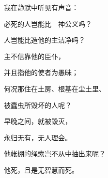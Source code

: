 {\par }{\Q 我在静默中听见有声音{}：
\par }{\Q {}必死的人岂能比　神公义吗？
\par }{\Q 人岂能比造他的主洁净吗？
\par }{\Q {}主不信靠他的臣仆，
\par }{\Q 并且指他的使者为愚昧；
\par }{\Q {}何况那住在土房、根基在尘土里、
\par }{\Q 被蠹虫所毁坏的人呢？
\par }{\Q {}早晚之间，就被毁灭，
\par }{\Q 永归无有，无人理会。
\par }{\Q {}他帐棚的绳索岂不从中抽出来呢？
\par }{\Q 他死，且是无智慧而死。

}
